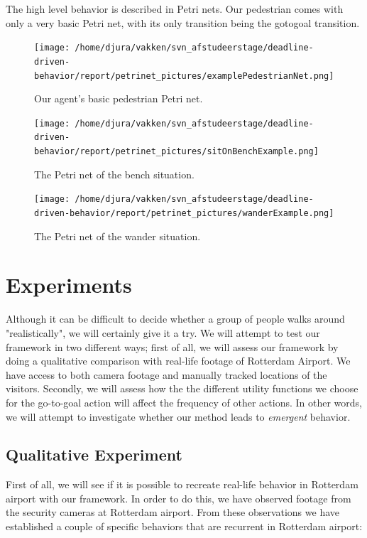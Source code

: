 \documentclass[11pt]{book}
\begin{document}
The high level behavior is described in Petri nets. Our pedestrian comes with only a very basic Petri net, with its only transition being the gotogoal transition.

\begin{figure}[h!]
\centering            
\texttt{[image: /home/djura/vakken/svn\_afstudeerstage/deadline-driven-behavior/report/petrinet\_pictures/examplePedestrianNet.png]}
\caption{Our agent's basic pedestrian Petri net.}
\label{fig:exampleAgentnet}
\end{figure} 
\begin{figure}[h!]
\centering            
\texttt{[image: /home/djura/vakken/svn\_afstudeerstage/deadline-driven-behavior/report/petrinet\_pictures/sitOnBenchExample.png]}
\caption{The Petri net of the bench situation.}
\label{fig:benchSituationNet}
\end{figure} 
\begin{figure}[h!]
\centering            
\texttt{[image: /home/djura/vakken/svn\_afstudeerstage/deadline-driven-behavior/report/petrinet\_pictures/wanderExample.png]}
\caption{The Petri net of the wander situation.}
\label{fig:benchSituationNet}
\end{figure}




\chapter{Experiments}
\label{chap:experiments}
Although it can be difficult to decide whether a group of people walks around "realistically", we will certainly give it a try. We will attempt to test our framework in two different ways; first of all, we will assess our framework by doing a qualitative comparison with real-life footage of Rotterdam Airport. We have access to both camera footage and manually tracked locations of the visitors.
Secondly, we will assess how the the different utility functions we choose for the go-to-goal action will affect the frequency of other actions. In other words, we will attempt to investigate whether our method leads to \emph{emergent} behavior.


\section{Qualitative Experiment}
First of all, we will see if it is possible to recreate real-life behavior in Rotterdam airport with our framework. In order to do this, we have observed footage from the security cameras at Rotterdam airport. From these observations we have established a couple of specific behaviors that are recurrent in Rotterdam airport:
\end{document}
